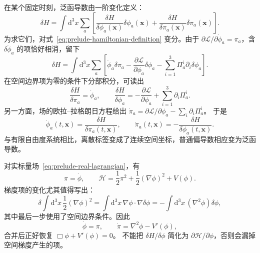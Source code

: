 在某个固定时刻，泛函导数由一阶变化定义：
\begin{equation}
  \delta H=\int\mathrm{d}^{3}x\sum_{a}\left[
    \frac{\delta H}{\delta\phi_{a}(\bm{x})}\delta\phi_{a}(\bm{x})
    +\frac{\delta H}{\delta\pi_{a}(\bm{x})}\delta\pi_{a}(\bm{x})\right].
\end{equation}
为求它们，对式~\eqref{eq:prelude-hamiltonian-definition} 变分。由于
$\partial\mathcal{L}/\partial\dot\phi_{a}=\pi_{a}$，含 $\delta\dot\phi_{a}$ 的项恰好相消，留下
\begin{equation}
  \delta H=\int\mathrm{d}^{3}x\sum_{a}\left[
    \dot\phi_{a}\delta\pi_{a}
    -\frac{\partial\mathcal{L}}{\partial\phi_{a}}\delta\phi_{a}
    -\sum_{i=1}^{3}\Pi_{a}^{i}\partial_{i}\delta\phi_{a}\right].
\end{equation}
在空间边界项为零的条件下分部积分，可读出
\begin{equation}
  \frac{\delta H}{\delta\pi_{a}}=\dot\phi_{a},\qquad
  \frac{\delta H}{\delta\phi_{a}}=-\frac{\partial\mathcal{L}}{\partial\phi_{a}}
  +\sum_{i=1}^{3}\partial_{i}\Pi_{a}^{i}.
\end{equation}
另一方面，场的欧拉--拉格朗日方程给出
$\dot\pi_{a}=\partial\mathcal{L}/\partial\phi_{a}-\sum_{i}\partial_{i}\Pi_{a}^{i}$。
于是
\begin{equation}
  \boxed{\dot\phi_{a}(t,\bm{x})=\frac{\delta H}{\delta\pi_{a}(t,\bm{x})},
  \qquad
  \dot\pi_{a}(t,\bm{x})=-\frac{\delta H}{\delta\phi_{a}(t,\bm{x})}.}
  \label{eq:prelude-hamilton-equations}
\end{equation}
与有限自由度系统相比，离散标签变成了连续空间坐标，普通偏导数相应变为泛函导数。

对实标量场~\eqref{eq:prelude-real-lagrangian}，有
\begin{equation}
  \pi=\dot\phi,\qquad
  \mathcal{H}=\frac12\pi^{2}+\frac12(\nabla\phi)^{2}+V(\phi).
  \label{eq:prelude-scalar-hamiltonian}
\end{equation}
梯度项的变化尤其值得写出：
\begin{equation}
  \delta\int\mathrm{d}^{3}x\,\frac12(\nabla\phi)^{2}
  =\int\mathrm{d}^{3}x\,\nabla\phi\cdot\nabla\delta\phi
  =-\int\mathrm{d}^{3}x\,(\nabla^{2}\phi)\delta\phi,
\end{equation}
其中最后一步使用了空间边界条件。因此
\begin{equation}
  \dot\phi=\pi,\qquad
  \dot\pi=\nabla^{2}\phi-V'(\phi),
\end{equation}
合并后正好恢复 $\Box\phi+V'(\phi)=0$。
不能把 $\delta H/\delta\phi$ 简化为 $\partial\mathcal{H}/\partial\phi$，否则会漏掉空间梯度产生的项。

